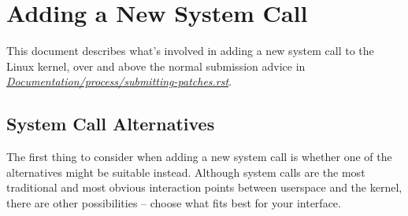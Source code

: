 \documentclass[a4paper,8pt,english]{sphinxmanual}
\begin{document}
\chapter{Adding a New System Call}
\label{process/adding-syscalls:adding-a-new-system-call}\label{process/adding-syscalls::doc}
This document describes what's involved in adding a new system call to the
Linux kernel, over and above the normal submission advice in
{\hyperref[process/submitting\string-patches:submittingpatches]{\emph{Documentation/process/submitting-patches.rst}}}.


\section{System Call Alternatives}
\label{process/adding-syscalls:system-call-alternatives}
The first thing to consider when adding a new system call is whether one of
the alternatives might be suitable instead.  Although system calls are the
most traditional and most obvious interaction points between userspace and the
kernel, there are other possibilities -- choose what fits best for your
interface.
\end{document}
